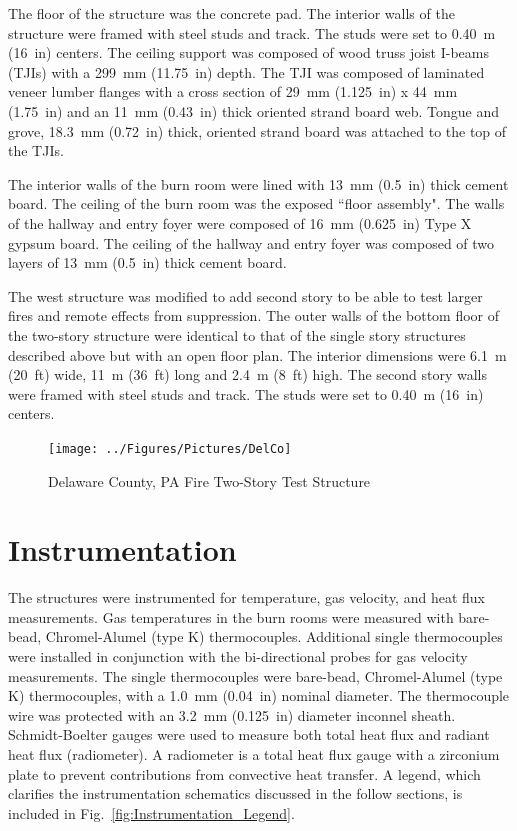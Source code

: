 \documentclass[12pt,oneside]{book}
\begin{document}
The floor of the structure was the concrete pad. The interior walls of the structure were framed with steel studs and track.  The studs were set to 0.40~m (16~in) centers. The ceiling support was composed of wood truss joist I-beams (TJIs) with a 299~mm (11.75~in) depth. The TJI was composed of laminated veneer lumber flanges with a cross section of 29~mm (1.125~in) x 44~mm (1.75~in) and an 11~mm (0.43~in) thick oriented strand board web. Tongue and grove, 18.3~mm (0.72~in) thick, oriented strand board was attached to the top of the TJIs.

The interior walls of the burn room were lined with 13~mm (0.5~in) thick cement board. The ceiling of the burn room was the exposed ``floor assembly". The walls of the hallway and entry foyer were composed of 16~mm (0.625~in) Type X gypsum board. The ceiling of the hallway and entry foyer was composed of two layers of 13~mm (0.5~in) thick cement board.

The west structure was modified to add second story to be able to test larger fires and remote effects from suppression. The outer walls of the bottom floor of the two-story structure were identical to that of the single story structures described above but with an open floor plan. The interior dimensions were 6.1~m (20~ft) wide, 11~m (36~ft) long and 2.4~m (8~ft) high. The second story walls were framed with steel studs and track. The studs were set to 0.40~m (16~in) centers. 

\begin{figure}[!ht]
	\texttt{[image: ../Figures/Pictures/DelCo]}
	\caption{Delaware County, PA Fire Two-Story Test Structure}
	\label{fig:delco_2story}
\end{figure}


\clearpage

\section{Instrumentation}
\label{sec:Instrumentation}

The structures were instrumented for temperature, gas velocity, and heat flux measurements. Gas temperatures in the burn rooms were measured with bare-bead, Chromel-Alumel (type K) thermocouples. Additional single thermocouples were installed in conjunction with the bi-directional probes for gas velocity measurements. The single thermocouples were bare-bead, Chromel-Alumel (type K) thermocouples, with a 1.0~mm (0.04~in) nominal diameter. The thermocouple wire was protected with an 3.2~mm (0.125~in) diameter inconnel sheath. Schmidt-Boelter gauges were used to measure both total heat flux and radiant heat flux (radiometer). A radiometer is a total heat flux gauge with a zirconium plate to prevent contributions from convective heat transfer. A legend, which clarifies the instrumentation schematics discussed in the follow sections, is included in Fig.~\ref{fig:Instrumentation_Legend}.
\end{document}
